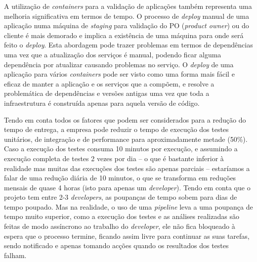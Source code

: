   \hspace{1cm}A utilização de \textit{containers} para a validação de aplicações também representa uma melhoria significativa em termos de tempo. O processo de \textit{deploy} manual de uma aplicação numa máquina de \textit{staging} para validação do PO (\textit{product owner}) ou do cliente é mais demorado e implica a existência de uma máquina para onde será feito o \textit{deploy}. Esta abordagem pode trazer problemas em termos de dependências uma vez que a atualização dos serviços é manual, podendo ficar alguma dependência por atualizar causando problemas no serviço. O \textit{deploy} de uma aplicação para vários \textit{containers} pode ser visto como uma forma mais fácil e eficaz de manter a aplicação e os serviços que a compõem, e resolve a problemática de dependências e versões antigas uma vez que toda a infraestrutura é construída apenas para aquela versão de código. 
 
 \hspace{1cm}Tendo em conta todos os fatores que podem ser considerados para a redução do tempo de entrega, a empresa pode reduzir o tempo de execução dos testes unitários, de integração e de performance para aproximadamente metade (50\%). Caso a execução dos testes consuma 10 minutos por execução, e assumindo a execução completa de testes 2 vezes por dia -- o que é bastante inferior à realidade mas muitas das execuções dos testes são apenas parciais -- estaríamos a falar de uma redução diária de 10 minutos, o que se transforma em reduções mensais de quase 4 horas (isto para apenas um \textit{developer}). Tendo em conta que o projeto tem entre 2-3 \textit{developers}, as poupanças de tempo sobem para dias de tempo poupado. Mas na realidade, o uso de uma \textit{pipeline} leva a uma poupança de tempo muito superior, como a execução dos testes e as análises realizadas são feitas de modo assíncrono ao trabalho do \textit{developer}, ele não fica bloqueado à espera que o processo termine, ficando assim livre para continuar as suas tarefas, sendo notificado e apenas tomando acções quando os resultados dos testes falham.
 
